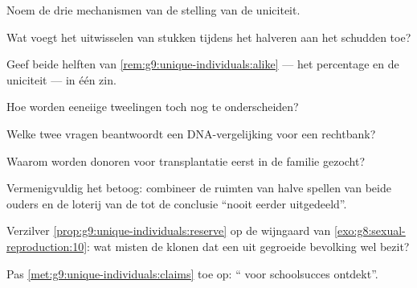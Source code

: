 \begin{exercise}[$\star$]\label{exo:g9:unique-individuals:1}
Noem de drie mechanismen van de stelling van de uniciteit.
\end{exercise}

\begin{exercise}[$\star$]\label{exo:g9:unique-individuals:2}
Wat voegt het uitwisselen van stukken tijdens het halveren aan
het schudden toe?
\end{exercise}

\begin{exercise}[$\star$]\label{exo:g9:unique-individuals:3}
Geef beide helften van \cref{rem:g9:unique-individuals:alike}
--- het percentage en de uniciteit --- in één
zin.
\end{exercise}

\begin{exercise}[$\star$]\label{exo:g9:unique-individuals:4}
Hoe worden eeneiige tweelingen toch nog te onderscheiden?
\end{exercise}

\begin{exercise}[$\star$]\label{exo:g9:unique-individuals:5}
Welke twee vragen beantwoordt een DNA-vergelijking voor een
rechtbank?
\end{exercise}

\begin{exercise}[$\star$]\label{exo:g9:unique-individuals:6}
Waarom worden donoren voor transplantatie eerst in de familie gezocht?
\end{exercise}

\begin{exercise}[$\star\star$]\label{exo:g9:unique-individuals:7}
Vermenigvuldig het betoog: combineer de ruimten van halve
spellen van beide ouders en de loterij van de  tot de
conclusie ``nooit eerder uitgedeeld''.
\end{exercise}

\begin{exercise}[$\star\star$]\label{exo:g9:unique-individuals:8}
Verzilver \cref{prop:g9:unique-individuals:reserve} op de
wijngaard van \cref{exo:g8:sexual-reproduction:10}: wat misten de
klonen dat een uit  gegroeide bevolking wel bezit?
\end{exercise}

\begin{exercise}[$\star\star$]\label{exo:g9:unique-individuals:9}
Pas \cref{met:g9:unique-individuals:claims} toe op: `` voor
schoolsucces ontdekt''.
\end{exercise}

